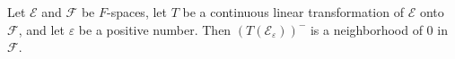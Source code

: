 Let $\mathcal{E}$ and $\mathcal{F}$ be $F$-spaces, let $T$ be a continuous linear transformation of $\mathcal{E}$ onto $\mathcal{F}$, and let $\varepsilon$ be a positive number. Then $(T(\mathcal{E}_\varepsilon))^-$ is a neighborhood of 0 in $\mathcal{F}$.
